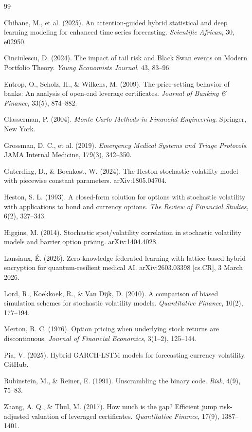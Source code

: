 \documentclass[12pt]{article}
\begin{document}
\begin{thebibliography}{99}

Chibane, M., et al. (2025). An attention-guided hybrid statistical and deep learning modeling
for enhanced time series forecasting. \textit{Scientific African}, 30, e02950.

Cinciulescu, D. (2024). The impact of tail risk and Black Swan events on Modern Portfolio Theory.
\textit{Young Economists Journal}, 43, 83--96.

Entrop, O., Scholz, H., \& Wilkens, M. (2009). The price-setting behavior of banks: An analysis
of open-end leverage certificates. \textit{Journal of Banking \& Finance}, 33(5), 874--882.

Glasserman, P. (2004). \textit{Monte Carlo Methods in Financial Engineering}.
Springer, New York.

Grossman, D. C., et al. (2019). \textit{Emergency Medical Systems and Triage Protocols}.
JAMA Internal Medicine, 179(3), 342--350.

Guterding, D., \& Boenkost, W. (2024). The Heston stochastic volatility model with piecewise
constant parameters. arXiv:1805.04704.

Heston, S. L. (1993). A closed-form solution for options with stochastic volatility with
applications to bond and currency options. \textit{The Review of Financial Studies}, 6(2), 327--343.

Higgins, M. (2014). Stochastic spot/volatility correlation in stochastic volatility models
and barrier option pricing. arXiv:1404.4028.

Lansiaux, \'{E}. (2026). Zero-knowledge federated learning with lattice-based hybrid
encryption for quantum-resilient medical AI. arXiv:2603.03398 [cs.CR], 3 March 2026.

Lord, R., Koekkoek, R., \& Van Dijk, D. (2010). A comparison of biased simulation schemes
for stochastic volatility models. \textit{Quantitative Finance}, 10(2), 177--194.

Merton, R. C. (1976). Option pricing when underlying stock returns are discontinuous.
\textit{Journal of Financial Economics}, 3(1--2), 125--144.

Pia, V. (2025). Hybrid GARCH-LSTM models for forecasting currency volatility. GitHub.

Rubinstein, M., \& Reiner, E. (1991). Unscrambling the binary code.
\textit{Risk}, 4(9), 75--83.

Zhang, A. Q., \& Thul, M. (2017). How much is the gap? Efficient jump risk-adjusted valuation
of leveraged certificates. \textit{Quantitative Finance}, 17(9), 1387--1401.

\end{thebibliography}
\end{document}
